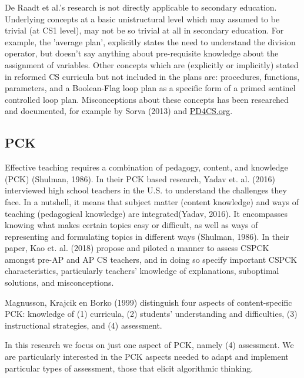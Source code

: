 De Raadt et al.'s research is not directly applicable to secondary education. Underlying concepts at a basic unistructural level which may assumed to be trivial (at CS1 level), may not be so trivial at all in secondary education. For example, the 'average plan', explicitly states the need to understand the division operator, but doesn't say anything about pre-requisite knowledge about the assignment of variables. Other concepts which are (explicitly or implicitly) stated in reformed CS curricula but not included in the plans are: procedures, functions, parameters, and a Boolean-Flag loop plan as a specific form of a primed sentinel controlled loop plan. Misconceptions about these concepts has been researched and documented, for example by Sorva (2013) and \url{PD4CS.org}.



\subsection*{PCK}

Effective teaching requires a combination of pedagogy, content, and knowledge (PCK) (Shulman, 1986).  In their PCK based research, Yadav et. al. (2016) interviewed high school teachers in the U.S. to understand the challenges they face.  In a nutshell, it means that subject matter (content knowledge) and ways of teaching (pedagogical knowledge) are integrated(Yadav, 2016). It encompasses knowing what makes certain topics easy or difficult, as well as ways of representing and formulating topics in different ways (Shulman, 1986). In their paper, Kao et. al. (2018) propose and piloted a manner to assess CSPCK amongst pre-AP and AP CS teachers, and in doing so specify important CSPCK characteristics, particularly teachers' knowledge of explanations, suboptimal solutions, and misconceptions.

Magnusson, Krajcik en Borko (1999) distinguish four aspects of content-specific PCK: knowledge of
(1) curricula, (2) students' understanding and difficulties, (3) instructional strategies, and (4) assessment.


In this research we focus on just one aspect of PCK, namely (4) assessment. We are particularly interested in the PCK aspects needed to adapt and implement particular types of assessment, those that elicit algorithmic thinking.


